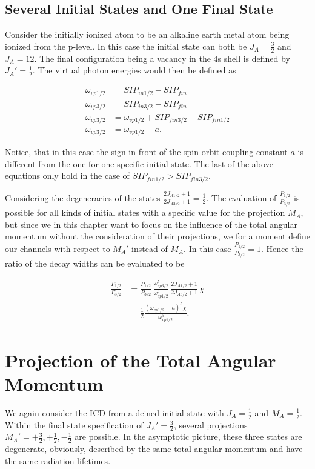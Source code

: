 \subsection{Several Initial States and One Final State}
Consider the initially ionized atom to be an alkaline earth metal atom
being ionized from the
p-level. In this case the initial state can both be $J_A = \frac 32$ and
$J_A = 12$. The final configuration being a vacancy in the 4s shell is defined
by $J_A'= \frac 12$.
The virtual photon energies would then be defined as

\begin{align}
  \omega_{vp1/2} &= SIP_{in1/2} - SIP_{fin}  \\
  \omega_{vp3/2} &= SIP_{in3/2} - SIP_{fin}  \\
  \omega_{vp3/2} &= \omega_{vp1/2} + SIP_{fin3/2} - SIP_{fin1/2} \\
  \omega_{vp3/2} &= \omega_{vp1/2} - a .
\end{align}

Notice, that in this case the sign in front of the spin-orbit coupling
constant $a$ is different from the one for one specific initial state.
The last of the above equations only hold in the case of
$SIP_{fin1/2} > SIP_{fin3/2}$.

Considering the degeneracies of the states
$\frac{2J_{A1/2}+1}{2J_{A3/2}+1} = \frac 12$.
The evaluation of $\frac{P_{1/2}}{P_{3/2}}$ is possible for all kinds
of initial states with a specific value for the projection $M_A$, but
since we in this chapter want to focus on the influence of the total
angular momentum without the consideration of their projections, we
for a moment define our channels with respect to $M_A'$ instead of
$M_A$. In this case $\frac{P_{1/2}}{P_{3/2}} = 1$.
Hence the ratio of the decay widths can be evaluated to be

\begin{align}
  \frac{\Gamma_{1/2}}{\Gamma_{3/2}}
  &= \frac{P_{1/2}}{P_{3/2}}
     \,\frac{\omega_{vp3/2}^5}{\omega_{vp1/2}^5}
     \,\frac{2J_{A1/2}+1}{2J_{A3/2}+1} \,\chi\\
  &= \frac 12 \frac{(\omega_{vp1/2} -a)^5 \chi}{\omega_{vp1/2}^5} .
\end{align}


\section{Projection of the Total Angular Momentum}
We again consider the ICD from a deined initial state with $J_A=\frac 12$ and
$M_A=\frac 12$. Within the final state specification of $J_A'=\frac 32$, several
projections $M_A'= +\frac 32, +\frac 12, -\frac 12$ are possible. In the asymptotic
picture, these three states are degenerate, obviously, described by the same
total angular momentum and have the same radiation lifetimes.

